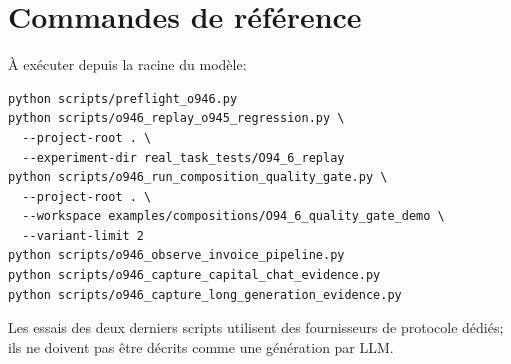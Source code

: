 \documentclass[11pt,a4paper]{article}
\begin{document}
\section{Commandes de référence}
À exécuter depuis la racine du modèle:
\begin{verbatim}
python scripts/preflight_o946.py
python scripts/o946_replay_o945_regression.py \
  --project-root . \
  --experiment-dir real_task_tests/O94_6_replay
python scripts/o946_run_composition_quality_gate.py \
  --project-root . \
  --workspace examples/compositions/O94_6_quality_gate_demo \
  --variant-limit 2
python scripts/o946_observe_invoice_pipeline.py
python scripts/o946_capture_capital_chat_evidence.py
python scripts/o946_capture_long_generation_evidence.py
\end{verbatim}
Les essais des deux derniers scripts utilisent des fournisseurs de protocole dédiés; ils ne doivent pas être décrits comme une génération par LLM.
\end{document}

